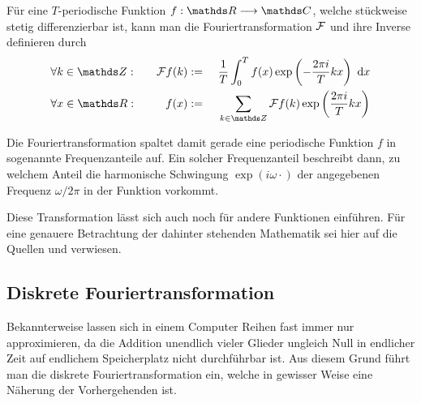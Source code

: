 			\begin{definition*}[Fouriertransformation]
				Für eine $T$-periodische Funktion $f:\SR\longrightarrow\SC$, welche stückweise stetig differenzierbar ist, kann man die Fouriertransformation $\mathcal{F}$ und ihre Inverse definieren durch
				\begin{alignat*}{4}
					&\forall k\in\SZ:\quad &\FF f(k) &:= &&\ \frac{1}{T}\integral{0}{T}{ f(x)\exp\curvb{ -\frac{2\pi i}{T}kx } }{x} \\
					&\forall x\in\SR:\quad &f(x) &:= &&\ \sum_{k\in\SZ}\FF f(k)\exp\curvb{ \frac{2\pi i}{T}kx }
				\end{alignat*}
			\end{definition*}

			Die Fouriertransformation spaltet damit gerade eine periodische Funktion $f$ in sogenannte Frequenzanteile auf.
			Ein solcher Frequenzanteil beschreibt dann, zu welchem Anteil die harmonische Schwingung $\exp(i\omega\cdot)$ der angegebenen Frequenz $\omega/2\pi$ in der Funktion vorkommt.
			
			Diese Transformation lässt sich auch noch für andere Funktionen einführen.
			Für eine genauere Betrachtung der dahinter stehenden Mathematik sei hier auf die Quellen \cite{stein-fa} und \cite{elstrodt-mit} verwiesen.


		\subsection{Diskrete Fouriertransformation} %
		\label{sub:diskrete_fouriertransformation}

			Bekannterweise lassen sich in einem Computer Reihen fast immer nur approximieren, da die Addition unendlich vieler Glieder ungleich Null in endlicher Zeit auf endlichem Speicherplatz nicht durchführbar ist.
			Aus diesem Grund führt man die diskrete Fouriertransformation ein, welche in gewisser Weise eine Näherung der Vorhergehenden ist.

